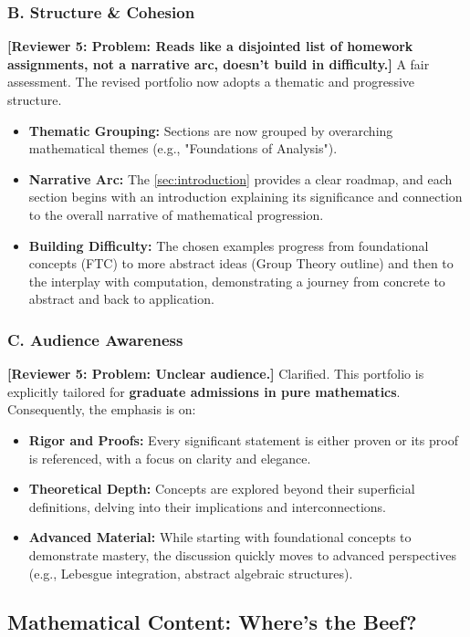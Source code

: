 \documentclass[11pt, a4paper]{article}
\theoremstyle{plain} %
\theoremstyle{definition} %
\theoremstyle{remark} %
\newcommand{\reviewer}[1]{\textcolor{reviewercolor}{\textbf{[Reviewer 5: #1]}}}
\begin{document}
\subsubsection*{B. Structure \& Cohesion}
\reviewer{Problem: Reads like a disjointed list of homework assignments, not a narrative arc, doesn't build in difficulty.}
A fair assessment. The revised portfolio now adopts a thematic and progressive structure.
\begin{itemize}
    \item \textbf{Thematic Grouping:} Sections are now grouped by overarching mathematical themes (e.g., "Foundations of Analysis").
    \item \textbf{Narrative Arc:} The \ref{sec:introduction} provides a clear roadmap, and each section begins with an introduction explaining its significance and connection to the overall narrative of mathematical progression.
    \item \textbf{Building Difficulty:} The chosen examples progress from foundational concepts (FTC) to more abstract ideas (Group Theory outline) and then to the interplay with computation, demonstrating a journey from concrete to abstract and back to application.

\end{itemize}
\subsubsection*{C. Audience Awareness}
\reviewer{Problem: Unclear audience.}
Clarified. This portfolio is explicitly tailored for \textbf{graduate admissions in pure mathematics}. Consequently, the emphasis is on:
\begin{itemize}
    \item \textbf{Rigor and Proofs:} Every significant statement is either proven or its proof is referenced, with a focus on clarity and elegance.
    \item \textbf{Theoretical Depth:} Concepts are explored beyond their superficial definitions, delving into their implications and interconnections.
    \item \textbf{Advanced Material:} While starting with foundational concepts to demonstrate mastery, the discussion quickly moves to advanced perspectives (e.g., Lebesgue integration, abstract algebraic structures).
\end{itemize}

\subsection{Mathematical Content: Where's the Beef?}
\end{document}
